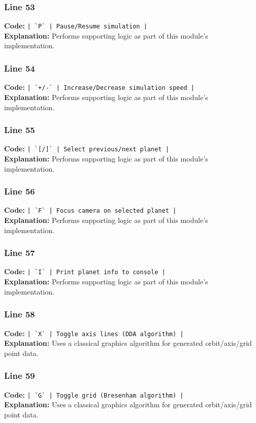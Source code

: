 \documentclass[11pt,a4paper]{article}
\begin{document}
\subsubsection*{Line 53}
\textbf{Code:} \verb!| `P` | Pause/Resume simulation |!\\
\textbf{Explanation:} Performs supporting logic as part of this module's implementation.

\subsubsection*{Line 54}
\textbf{Code:} \verb!| `+/-` | Increase/Decrease simulation speed |!\\
\textbf{Explanation:} Performs supporting logic as part of this module's implementation.

\subsubsection*{Line 55}
\textbf{Code:} \verb!| `[/]` | Select previous/next planet |!\\
\textbf{Explanation:} Performs supporting logic as part of this module's implementation.

\subsubsection*{Line 56}
\textbf{Code:} \verb!| `F` | Focus camera on selected planet |!\\
\textbf{Explanation:} Performs supporting logic as part of this module's implementation.

\subsubsection*{Line 57}
\textbf{Code:} \verb!| `I` | Print planet info to console |!\\
\textbf{Explanation:} Performs supporting logic as part of this module's implementation.

\subsubsection*{Line 58}
\textbf{Code:} \verb!| `X` | Toggle axis lines (DDA algorithm) |!\\
\textbf{Explanation:} Uses a classical graphics algorithm for generated orbit/axis/grid point data.

\subsubsection*{Line 59}
\textbf{Code:} \verb!| `G` | Toggle grid (Bresenham algorithm) |!\\
\textbf{Explanation:} Uses a classical graphics algorithm for generated orbit/axis/grid point data.
\end{document}
